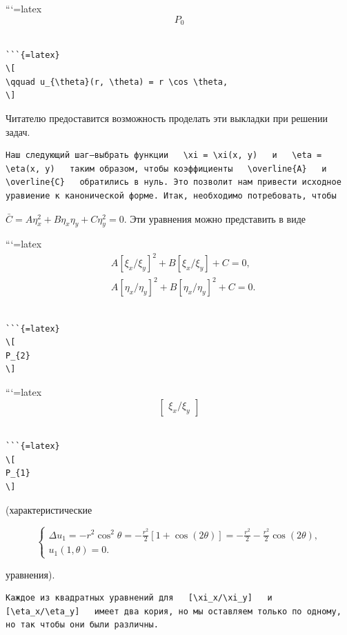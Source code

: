\documentclass[
]{article}
\begin{document}
```{=latex}
\[
P_{0}
\]

\begin{verbatim}

```{=latex}
\[
\qquad u_{\theta}(r, \theta) = r \cos \theta,
\]
\end{verbatim}

Читателю предоставится возможность проделать эти выкладки при решении
задач.

\begin{verbatim}
Наш следующий шаг—выбрать функции   \xi = \xi(x, y)   и   \eta = \eta(x, y)   таким образом, чтобы коэффициенты   \overline{A}   и   \overline{C}   обратились в нуль. Это позволит нам привести исходное уравиение к канонической форме. Итак, необходимо потребовать, чтобы
\end{verbatim}

\(\bar{C} = A\eta_x^2 + B\eta_x\eta_y + C\eta_y^2 = 0.\) Эти уравнения
можно представить в виде

```{=latex}
\[
\begin{split} &A\left[\xi_{x}/\xi_{y}\right]^{2}+B\left[\xi_{x}/\xi_{y}\right]+C=0,\\ &A\left[\eta_{x}/\eta_{y}\right]^{2}+B\left[\eta_{x}/\eta_{y}\right]^{2}+C=0. \end{split}
\]

\begin{verbatim}

```{=latex}
\[
P_{2}
\]
\end{verbatim}

```{=latex}
\[
\begin{bmatrix} \xi_x/\xi_y \end{bmatrix}
\]

\begin{verbatim}

```{=latex}
\[
P_{1}
\]
\end{verbatim}

(характеристические

\[
\begin{cases} \Delta u_{1} = -r^{2} \cos^{2} \theta = -\frac{r^{2}}{2} \left[1 + \cos(2\theta)\right] = -\frac{r^{2}}{2} - \frac{r^{2}}{2} \cos(2\theta), \\ u_{1}(1, \theta) = 0. \end{cases}
\]

уравнения).

\begin{verbatim}
Kaждое из квадратных уравнений для   [\xi_x/\xi_y]   и   [\eta_x/\eta_y]   имеет два кория, но мы оставляем только по одному, но так чтобы они были различны.
\end{verbatim}
\end{document}
